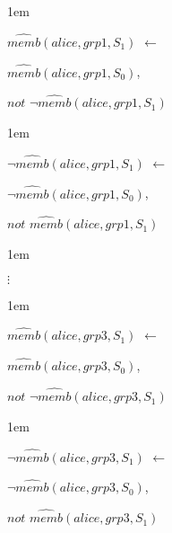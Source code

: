\documentclass[global,twocolumn,final]{svjour}
\newenvironment{vexample}
  {\begin{example}\hspace{0.25em}}
  {\end{example}}
\newenvironment{vquote}
  {\begin{list}{}{\leftmargin 1em}\item[]}
  {\end{list}}
\begin{document}
\begin{vexample}
\begin{enumerate}
              \begin{vquote}
                $\hat{memb}(alice, grp1, S_{1})$ $\leftarrow$

                \hspace{1em}
                $\hat{memb}(alice, grp1, S_{0})$,

                \hspace{1em}
                $not$ $\lnot\hat{memb}(alice, grp1, S_{1})$
              \end{vquote}

              \begin{vquote}
                $\lnot \hat{memb}(alice, grp1, S_{1})$ $\leftarrow$

                \hspace{1em}
                $\lnot\hat{memb}(alice, grp1, S_{0})$,

                \hspace{1em}
                $not$ $\hat{memb}(alice, grp1, S_{1})$
              \end{vquote}

              \begin{vquote}
                \hspace{2em}$\vdots$
              \end{vquote}

              \begin{vquote}
                $\hat{memb}(alice, grp3, S_{1})$ $\leftarrow$

                \hspace{1em}
                $\hat{memb}(alice, grp3, S_{0})$,

                \hspace{1em}
                $not$ $\lnot\hat{memb}(alice, grp3, S_{1})$
              \end{vquote}

              \begin{vquote}
                $\lnot\hat{memb}(alice, grp3, S_{1})$ $\leftarrow$

                \hspace{1em}
                $\lnot\hat{memb}(alice, grp3, S_{0})$,

                \hspace{1em}
                $not$ $\hat{memb}(alice, grp3, S_{1})$
              \end{vquote}


\end{enumerate}
\end{vexample}
\end{document}
